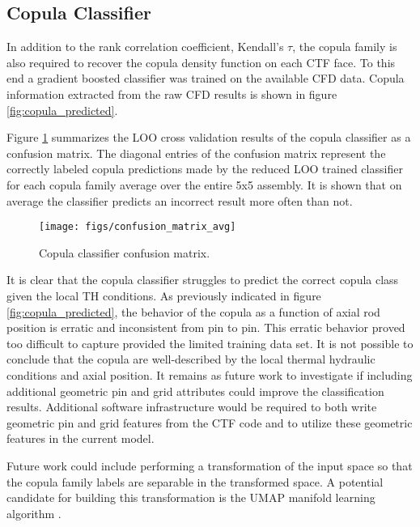 \subsection{Copula Classifier}

In addition to the rank correlation coefficient, Kendall's $\tau$, the copula family is also required to recover the copula density function on each CTF face.  To this end a gradient boosted classifier was trained on the available CFD data.  Copula information extracted from the raw CFD results is shown in figure \ref{fig:copula_predicted}.

Figure \ref{fig:confusionmatrixavg} summarizes the LOO cross validation results of the copula classifier as a confusion matrix.  The diagonal entries of the confusion matrix represent the correctly labeled copula predictions made by the reduced LOO trained classifier for each copula family average over the entire 5x5 assembly.  It is shown that on average the classifier predicts an incorrect result more often than not.

\begin{figure}[H]
    \centering
    \texttt{[image: figs/confusion\_matrix\_avg]}
    \caption[Copula classifier confusion matrix.]{Copula classifier confusion matrix.}
    \label{fig:confusionmatrixavg}
\end{figure}


It is clear that the copula classifier struggles to predict the correct copula class given the local TH conditions.  As previously indicated in figure \ref{fig:copula_predicted}, the behavior of the copula as a function of axial rod position is erratic and inconsistent from pin to pin.  This erratic behavior proved too difficult to capture provided the limited training data set.  It is not possible to conclude that the copula are well-described by the local thermal hydraulic conditions and axial position.  It remains as future work to investigate if including additional geometric pin and grid attributes could improve the classification results.  Additional software infrastructure would be required to both write geometric pin and grid features from the CTF code and to utilize these geometric features in the current model.

Future work could include performing a transformation of the input space so that the copula family labels are separable in the transformed space.  A potential candidate for building this transformation is the UMAP manifold learning algorithm \cite{UMAP18}.

